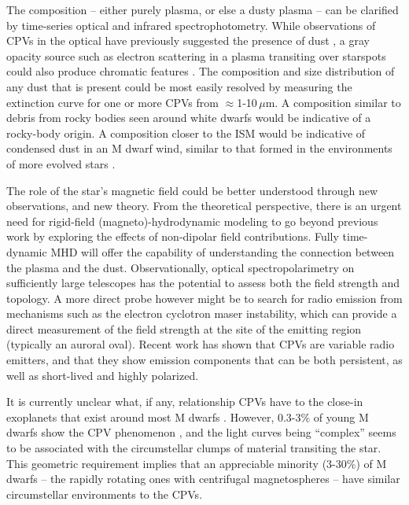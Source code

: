 \documentclass{nature3}
\begin{document}
The composition -- either purely plasma, or else a dusty plasma -- can
be clarified by time-series optical and infrared spectrophotometry.
While observations of CPVs in the optical have previously suggested
the presence of dust \cite{Gunther2022,Koen2023}, a gray opacity
source such as electron scattering in a plasma transiting over
starspots could also produce chromatic features \cite{Rackham2018}.
The composition and size distribution of any dust that is present
could be most easily resolved by measuring the extinction curve for
one or more CPVs from $\approx$1-10\,$\mu$m.  A composition similar to
debris from rocky bodies seen around white dwarfs \cite{Reach2009}
would be indicative of a rocky-body origin.  A composition closer to
the ISM would be indicative of condensed dust in an M dwarf wind,
similar to that formed in the environments of more evolved stars
\cite{Marigo2008}.

The role of the star's magnetic field could be better understood
through new observations, and new theory.  From the theoretical
perspective, there is an urgent need for rigid-field
(magneto)-hydrodynamic modeling to go beyond previous work
\cite{Townsend2005,Townsend2008} by exploring the effects of
non-dipolar field contributions.
Fully time-dynamic MHD \cite{Daley-Yates2024} will offer the
capability of understanding the connection between the plasma and the
dust.  %
Observationally, optical spectropolarimetry on sufficiently large
telescopes has the potential to assess both the field strength and
topology.  A more direct probe however might be to search for radio
emission from mechanisms such as the electron cyclotron maser
instability, which can provide a direct measurement of the field
strength at the site of the emitting region (typically an auroral
oval).  Recent work \cite{Kaur2024} has shown that CPVs are variable
radio emitters, and that they show emission components that can be
both persistent, as well as short-lived and highly polarized.

It is currently unclear what, if any, relationship CPVs have to the
close-in exoplanets that exist around most M dwarfs
\cite{Dressing2015}.  However, 0.3-3\% of young M dwarfs show the CPV
phenomenon \cite{Rebull2020}, and the light curves being ``complex''
seems to be associated with the circumstellar clumps of material
transiting the star.  This geometric requirement implies that an
appreciable minority (3-30\%) of M dwarfs -- the rapidly rotating ones
with centrifugal magnetospheres -- have similar circumstellar
environments to the CPVs.
\end{document}
